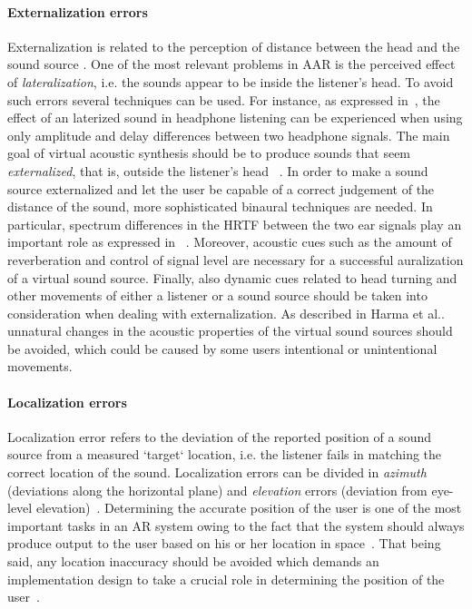 \documentclass[journal]{IEEEtran}
\begin{document}
\paragraph{Externalization errors}
Externalization is related to the perception of distance between the head and the sound source \cite{Tame2012}. One of the most relevant problems in AAR is the perceived effect of \emph{lateralization}, i.e. the sounds appear to be inside the listener's head. To avoid such errors several techniques can be used. For instance, as expressed in~\cite{harma2004}, the effect of an laterized sound in headphone listening can be experienced when using only amplitude and delay differences between two headphone signals. The main goal of virtual acoustic synthesis should be to produce sounds that seem \emph{externalized}, that is, outside the listener's head ~\cite{begault2001}. In order to make a sound source externalized and let the user be capable of a correct judgement of the distance of the sound, more sophisticated binaural techniques are needed. In particular, spectrum differences in the HRTF between the two ear signals play an important role as expressed in ~\cite{harma2004}. Moreover, acoustic cues such as the amount of reverberation and control of signal level are necessary for a successful auralization of a virtual sound source. Finally, also dynamic cues related to head turning and other movements of either a listener or a sound source should be taken into consideration when dealing with externalization. As described in Harma et al..~\cite{harma2004} unnatural changes in the acoustic properties of the virtual sound sources should be avoided, which could be caused by some users intentional or unintentional movements.

\paragraph{Localization errors}
Localization error refers to the deviation of the reported position of a sound source from a measured `target` location, i.e. the listener fails in matching the correct location of the sound. Localization errors can be divided in \emph{azimuth} (deviations along the horizontal plane) and \emph{elevation} errors (deviation from eye-level elevation)~\cite{begault2001}. Determining the accurate position of the user is one of the most important tasks in an AR system owing to the fact that the system should always produce output to the user based on his or her location in space~\cite{rozier2000}. That being said, any location inaccuracy should be avoided which demands an implementation design to take a crucial role in determining the position of the user~\cite{alvarez2011}.
\end{document}
